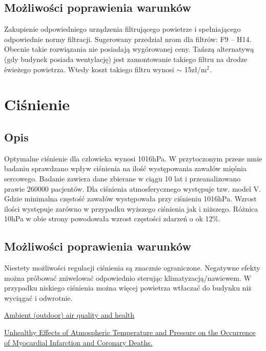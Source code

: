 \documentclass[10pt, a4paper]{article}
\begin{document}
	\subsection{Możliwości poprawienia warunków}
	Zakupienie odpowiedniego urządzenia filtrującego powietrze i spełniającego odpowiednie normy filtracji. Sugerowany przedział nrom dla filtrów: F9 – H14. Obecnie takie rozwiązania nie posiadają wygórowanej ceny. Tańszą alternatywą (gdy budynek posiada wentylację) jest zamontowanie takiego filtru na drodze świeżego powietrza. Wtedy koszt takiego filtru wynosi $\sim$ 15zł/m$^2$.
	
\section{Ciśnienie}
	\subsection{Opis}
	Optymalne ciśnienie dla człowieka wynosi 1016hPa. W przytoczonym przeze mnie badaniu\cite{Badanie} sprawdzano wpływ ciśnienia na ilość występowania zawałów mięśnia sercowego. Badanie zawiera dane zbierane w ciągu 10 lat i przeanalizowano prawie 260000 pacjentów. Dla ciśnienia atmosferycznego występuje tzw. model V. Gdzie minimalna częstość zawałów występowała przy ciśnieniu 1016hPa. Wzrost ilości występuje zarówno w przypadku wyższego ciśnienia jak i niższego. Różnica 10hPa w obie strony powodowała wzrost częstości zdarzeń o ok 12$\%$.
	\subsection{Możliwości poprawienia warunków}
	Niestety możliwości regulacji ciśnienia są znacznie ograniczone. Negatywne efekty można próbować zniwelować odpowiednio sterując klimatyzacją/nawiewem. W przypadku niskiego ciśnienia można więcej powietrza wtłaczać do budynku niż wyciągać i odwrotnie.
	
\begin{thebibliography}{9}
	
	\href{https://www.who.int/news-room/fact-sheets/detail/ambient-(outdoor)-air-quality-and-health}{Ambient (outdoor) air quality and health}

	\href{https://www.ahajournals.org/doi/full/10.1161/01.CIR.100.1.e1}{Unhealthy Effects of Atmospheric Temperature and Pressure on the Occurrence of Myocardial Infarction and Coronary Deaths.}
	
\end{thebibliography}
\end{document}
